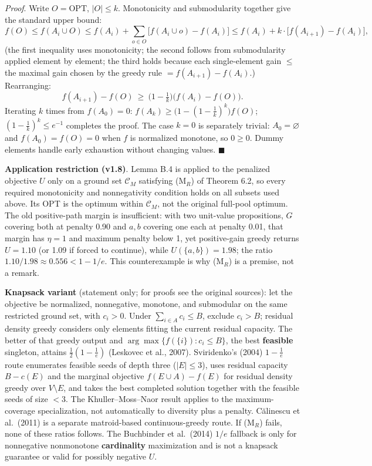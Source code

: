 \documentclass[
  11pt]{article}
\begin{document}
\emph{Proof}. Write \(O = \mathrm{OPT}\), \(|O| \le k\). Monotonicity
and submodularity together give the standard upper bound:
\[f(O) \le f(A_i \cup O) \le f(A_i) + \sum_{o \in O}\big[f(A_i \cup o) - f(A_i)\big] \le f(A_i) + k\cdot\big[f(A_{i+1}) - f(A_i)\big],\]
(the first inequality uses monotonicity; the second follows from
submodularity applied element by element; the third holds because each
single-element gain \(\le\) the maximal gain chosen by the greedy rule
\(= f(A_{i+1}) - f(A_i)\).) Rearranging:
\[f(A_{i+1}) - f(O) \ \ge\ \big(1 - \tfrac1k\big)\big(f(A_i) - f(O)\big).\]
Iterating \(k\) times from \(f(A_0) = 0\):
\(f(A_k) \ge \big(1 - (1-\tfrac1k)^k\big) f(O)\);
\((1-\tfrac1k)^k \le e^{-1}\) completes the proof. The case \(k=0\) is
separately trivial: \(A_0=\varnothing\) and \(f(A_0)=f(O)=0\) when \(f\)
is normalized monotone, so \(0\ge0\). Dummy elements handle early
exhaustion without changing values. \(\blacksquare\)

\textbf{Application restriction (v1.8)}. Lemma B.4 is applied to the
penalized objective \(U\) only on a ground set \(\mathcal C_M\)
satisfying (M\(_R\)) of Theorem 6.2, so every required monotonicity and
nonnegativity condition holds on all subsets used above. Its OPT is the
optimum within \(\mathcal C_M\), not the original full-pool optimum. The
old positive-path margin is insufficient: with two unit-value
propositions, \(G\) covering both at penalty 0.90 and \(a,b\) covering
one each at penalty 0.01, that margin has \(\eta=1\) and maximum penalty
below 1, yet positive-gain greedy returns \(U=1.10\) (or 1.09 if forced
to continue), while \(U(\{a,b\})=1.98\); the ratio
\(1.10/1.98\approx0.556<1-1/e\). This counterexample is why (M\(_R\)) is
a premise, not a remark.

\textbf{Knapsack variant} (statement only; for proofs see the original
sources): let the objective be normalized, nonnegative, monotone, and
submodular on the same restricted ground set, with \(c_i>0\). Under
\(\sum_{i\in A}c_i\le B\), exclude \(c_i>B\); residual density greedy
considers only elements fitting the current residual capacity. The
better of that greedy output and \(\arg\max\{f(\{i\}):c_i\le B\}\), the
best \textbf{feasible} singleton, attains \(\frac12(1-\frac1e)\)
(Leskovec et al., 2007). Sviridenko's (2004) \(1-\frac1e\) route
enumerates feasible seeds of depth three (\(|E|\le3\)), uses residual
capacity \(B-c(E)\) and the marginal objective \(f(E\cup A)-f(E)\) for
residual density greedy over \(V\setminus E\), and takes the best
completed solution together with the feasible seeds of size \(<3\). The
Khuller--Moss--Naor result applies to the maximum-coverage
specialization, not automatically to diversity plus a penalty. Călinescu
et al.~(2011) is a separate matroid-based continuous-greedy route. If
(M\(_R\)) fails, none of these ratios follows. The Buchbinder et
al.~(2014) \(1/e\) fallback is only for nonnegative nonmonotone
\textbf{cardinality} maximization and is not a knapsack guarantee or
valid for possibly negative \(U\).
\end{document}
